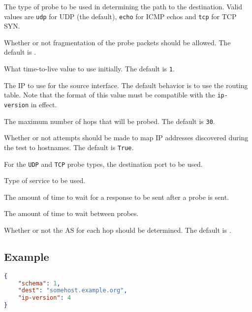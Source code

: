 \documentclass[10pt]{article}
\begin{document}
 The type of probe to be used in
determining the path to the destination.  Valid values are {\tt udp}
for UDP (the default), {\tt echo} for ICMP echos and {\tt tcp} for TCP
SYN.

 Whether or not fragmentation of the
probe packets should be allowed.  The default is \false.

 What time-to-live value to use
initially.  The default is {\tt 1}.




 The IP to use for the source interface.  The
default behavior is to use the routing table.  Note that the format of
this value must be compatible with the {\tt ip-version} in effect.

 The maximum number of hops that will be
probed.  The default is {\tt 30}.

 Whether or not attempts should be made
to map IP addresses discovered during the test to hostnames.  The
default is {\tt True}.

 For the {\tt UDP} and {\tt TCP} probe
types, the destination port to be used.

 Type of service to be used.  

 The amount of time to wait for a response
to be sent after a probe is sent.



 The amount of time to wait between
probes.

 Whether or not the AS for each hop should be
determined.  The default is \false.



\subsection{Example}
\begin{lstlisting}[language=json]
{
    "schema": 1,
    "dest": "somehost.example.org",
    "ip-version": 4
}
\end{lstlisting}
\end{document}

